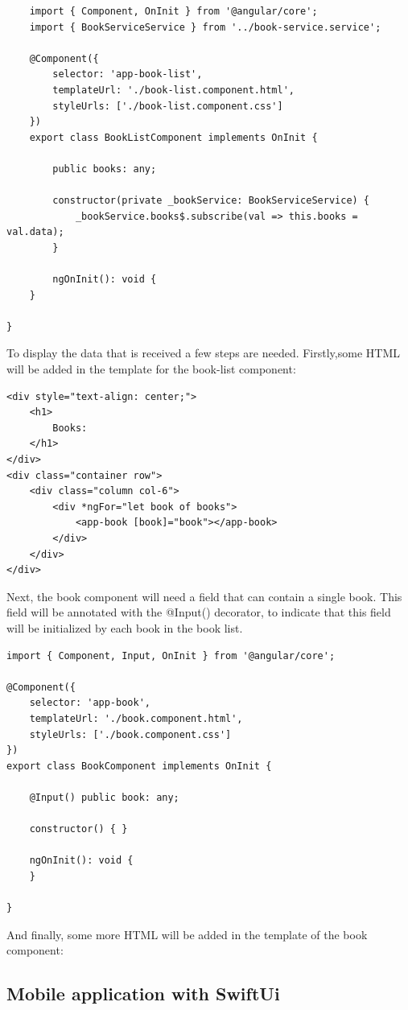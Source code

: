 \begin{lstlisting}
	import { Component, OnInit } from '@angular/core';
	import { BookServiceService } from '../book-service.service';

	@Component({
		selector: 'app-book-list',
		templateUrl: './book-list.component.html',
		styleUrls: ['./book-list.component.css']
	})
	export class BookListComponent implements OnInit {
	
		public books: any;
	
		constructor(private _bookService: BookServiceService) {
			_bookService.books$.subscribe(val => this.books = val.data);
		}
	
		ngOnInit(): void {
	}
	
}
\end{lstlisting}

To display the data that is received a few steps are needed. Firstly,some HTML will be added in the template for the book-list component:
\begin{lstlisting}
<div style="text-align: center;">
	<h1>
		Books:
	</h1>
</div>
<div class="container row">
	<div class="column col-6">
		<div *ngFor="let book of books">
			<app-book [book]="book"></app-book>
		</div>
	</div>
</div>
\end{lstlisting}

Next, the book component will need a field that can contain a single book. This field will be annotated with the @Input() decorator, to indicate that this field will be initialized by each book in the book list.

\begin{lstlisting}
import { Component, Input, OnInit } from '@angular/core';

@Component({
	selector: 'app-book',
	templateUrl: './book.component.html',
	styleUrls: ['./book.component.css']
})
export class BookComponent implements OnInit {
	
	@Input() public book: any;
	
	constructor() { }
	
	ngOnInit(): void {
	}
	
}
\end{lstlisting}

And finally, some more HTML will be added in the template of the book component:




\subsection{Mobile application with SwiftUi}